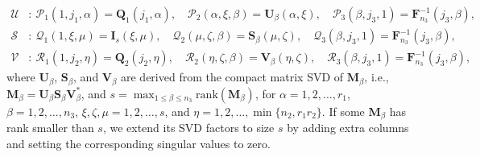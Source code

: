 \documentclass[onefignum,onetabnum]{siamart250211}
\begin{document}
\begin{proposition} 
\begin{align*}
    \mathscr{U}&: \ 
    \mathscr{P}_1(1,j_1,\alpha)=\textbf{Q}_1(j_1,\alpha), \quad
    \mathscr{P}_2(\alpha,\xi,\beta)=\textbf{U}_{\beta}(\alpha,\xi), \quad
    \mathscr{P}_3(\beta,j_3,1)=\textbf{F}_{n_3}^{-1}(j_3,\beta),\\
    \mathscr{S}&: \ 
    \mathscr{Q}_1(1,\xi,\mu)=\textbf{I}_{s}(\xi,\mu), \quad
    \mathscr{Q}_2(\mu,\zeta,\beta)=\textbf{S}_{\beta}(\mu,\zeta), \quad
    \mathscr{Q}_3(\beta,j_3,1)=\textbf{F}_{n_3}^{-1}(j_3,\beta),\\
    \mathscr{V}&: \ 
    \mathscr{R}_1(1,j_2,\eta)=\textbf{Q}_2(j_2,\eta), \quad
    \mathscr{R}_2(\eta,\zeta,\beta)=\textbf{V}_{\beta}(\eta,\zeta), \quad
    \mathscr{R}_3(\beta,j_3,1)=\textbf{F}_{n_3}^{-1}(j_3,\beta),
\end{align*}
where $\textbf{U}_\beta$, $\textbf{S}_\beta$, and $\textbf{V}_\beta$ are derived from the compact matrix SVD of $\textbf{M}_\beta$, i.e., $\textbf{M}_\beta=\textbf{U}_\beta\textbf{S}_\beta\textbf{V}_\beta^{*}$, and $s=\max_{1\leq \beta\leq n_3}\text{rank}(\textbf{M}_\beta)$, for $\alpha=1, 2, \dots,r_1$, $\beta=1,2,\dots,n_3$,
$\xi,\zeta,\mu=1,2,\dots,s$, and $\eta=1,2, \dots, \min\{n_2,r_1r_2\}$. If some $\textbf{M}_\beta$ has rank smaller than $s$, we extend its SVD factors to size $s$ by adding extra columns and setting the corresponding singular values to zero.
\end{proposition}
\end{document}
